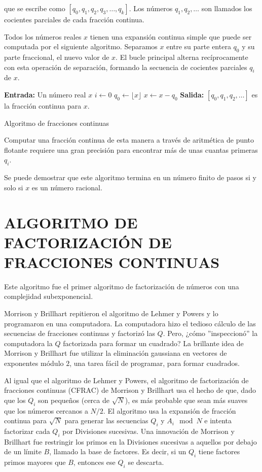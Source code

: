     que se escribe como $[q_0, q_1, q_2, q_3, \dots, q_k]$. Los números $q_1, q_2, \dots$ son llamados los cocientes parciales de cada fracción continua.

    Todos los números reales $x$ tienen una expansión continua simple que puede ser computada por el siguiente algoritmo. Separamos $x$ entre su parte entera $q_0$ y su parte fraccional, el nuevo valor de $x$. El bucle principal alterna recíprocamente con esta operación de separación, formando la secuencia de cocientes parciales $q_i$ de $x$. 

    \begin{algorithm}[H]
        \SetAlgoLined
        \textbf{Entrada:} Un número real $x$\;
        $i \leftarrow 0$\;
        $q_0 \leftarrow \lfloor x \rfloor$\;
        $x \leftarrow x - q_0$\;
        \textbf{Salida:} $[q_0, q_1, q_2, \dots]$ es la fracción continua para $x$.\ 
        \caption{Algoritmo de fracciones continuas}
    \end{algorithm}

    Computar una fracción continua de esta manera a través de aritmética de punto flotante requiere una gran precisión para encontrar más de unas cuantas primeras $q_i$.
    
    Se puede demostrar que este algoritmo termina en un número finito de pasos si y solo si $x$ es un número racional.

    \section{ALGORITMO DE FACTORIZACIÓN DE FRACCIONES CONTINUAS}
    Este algoritmo fue el primer algoritmo de factorización de números con una complejidad subexponencial.

    Morrison y Brillhart repitieron el algoritmo de Lehmer y Powers y lo programaron en una computadora. La computadora hizo el tedioso cálculo de las secuencias de fracciones continuas y factorizó las $Q$. Pero, ¿cómo ''inspeccionó'' la computadora la $Q$ factorizada para formar un cuadrado? La brillante idea de Morrison y Brillhart fue utilizar la eliminación gaussiana en vectores de exponentes módulo $2$, una tarea fácil de programar, para formar cuadrados. \citep{Morrison1975}

    Al igual que el algoritmo de Lehmer y Powers, el algoritmo de factorización de fracciones continuas (CFRAC) de Morrison y Brillhart usa el hecho de que, dado que los $Q_i$ son pequeños (cerca de $\sqrt{N}$), es más probable que sean más suaves que los números cercanos a $N/2$. El algoritmo usa la expansión de fracción continua para $\sqrt{N}$ para generar las secuencias ${Q_i}$ y ${A_i \mod N}$ e intenta factorizar cada $Q_i$ por Divisiones sucesivas. Una innovación de Morrison y Brillhart fue restringir los primos en la Divisiones sucesivas a aquellos por debajo de un límite $B$, llamado la base de factores. Es decir, si un $Q_i$ tiene factores primos mayores que $B$, entonces ese $Q_i$ se descarta.

